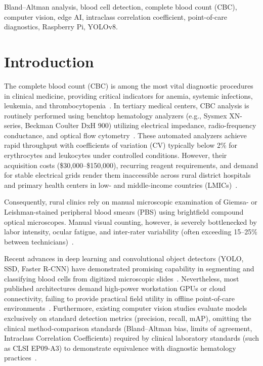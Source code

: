 \documentclass[10pt,conference]{IEEEtran}
\begin{document}
\begin{IEEEkeywords}
Bland--Altman analysis, blood cell detection, complete blood count (CBC), computer vision, edge AI, intraclass correlation coefficient, point-of-care diagnostics, Raspberry Pi, YOLOv8.
\end{IEEEkeywords}

\section{Introduction}
\label{sec:intro}

The complete blood count (CBC) is among the most vital diagnostic procedures in clinical medicine, providing critical indicators for anemia, systemic infections, leukemia, and thrombocytopenia~\cite{briggs2009}. In tertiary medical centers, CBC analysis is routinely performed using benchtop hematology analyzers (e.g., Sysmex XN-series, Beckman Coulter DxH 900) utilizing electrical impedance, radio-frequency conductance, and optical flow cytometry~\cite{sysmex2020, horiba2022}. These automated analyzers achieve rapid throughput with coefficients of variation (CV) typically below 2\% for erythrocytes and leukocytes under controlled conditions. However, their acquisition costs (\$30,000–\$150,000), recurring reagent requirements, and demand for stable electrical grids render them inaccessible across rural district hospitals and primary health centers in low- and middle-income countries (LMICs)~\cite{who2011}.

Consequently, rural clinics rely on manual microscopic examination of Giemsa- or Leishman-stained peripheral blood smears (PBS) using brightfield compound optical microscopes. Manual visual counting, however, is severely bottlenecked by labor intensity, ocular fatigue, and inter-rater variability (often exceeding 15–25\% between technicians)~\cite{rumke1985, palmer2015}.

Recent advances in deep learning and convolutional object detectors (YOLO, SSD, Faster R-CNN) have demonstrated promising capability in segmenting and classifying blood cells from digitized microscopic slides~\cite{liang2018, kc2021, liu2022}. Nevertheless, most published architectures demand high-power workstation GPUs or cloud connectivity, failing to provide practical field utility in offline point-of-care environments~\cite{shakarami2021, lin2020}. Furthermore, existing computer vision studies evaluate models exclusively on standard detection metrics (precision, recall, mAP), omitting the clinical method-comparison standards (Bland--Altman bias, limits of agreement, Intraclass Correlation Coefficients) required by clinical laboratory standards (such as CLSI EP09-A3) to demonstrate equivalence with diagnostic hematology practices~\cite{clsi2013, bland1986}.
\end{document}

